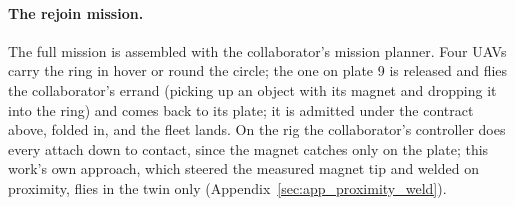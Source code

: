 \paragraph{The rejoin mission.} The full mission is assembled with the collaborator's mission planner. Four UAVs
carry the ring in hover or round the circle; the one on plate 9 is released and flies the collaborator's errand
(picking up an object with its magnet and dropping it into the ring) and comes back to its plate; it is admitted
under the contract above, folded in, and the fleet lands. On the rig the collaborator's controller does every
attach down to contact, since the magnet catches only on the plate; this work's own approach, which steered the
measured magnet tip and welded on proximity, flies in the twin only (Appendix~\ref{sec:app_proximity_weld}).


